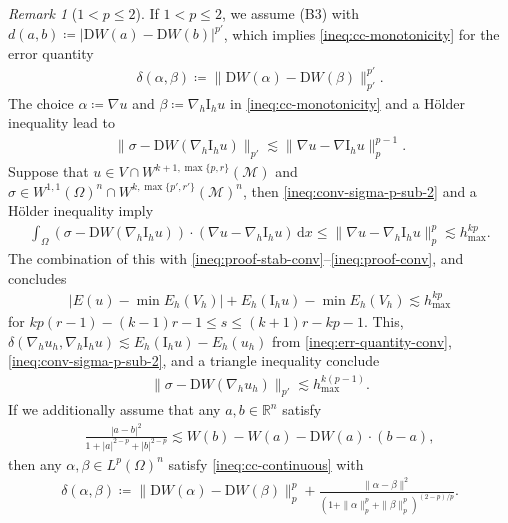 \documentclass[a4paper]{amsart}
\numberwithin{equation}{section}
\renewcommand{\d}[1]{\,\mathrm{d}#1}
\newcommand{\I}{\mathrm{I}}
\newcommand{\Mcal}{\mathcal{M}}
\newcommand{\D}{\mathrm{D}}
\theoremstyle{remark}
\newtheorem{remark}[theorem]{Remark}
\begin{document}
\begin{remark}[$1 < p \leq 2$]\label{remark:p_smaller_2}
    If $1 < p \leq 2$,
    we assume (B3) with $d(a,b) \coloneqq |\D W(a) - \D W(b)|^{p'}$, which implies \eqref{ineq:cc-monotonicity} for the error quantity
    \begin{align*}
    	\delta(\alpha,\beta) \coloneqq \|\D W(\alpha) - \D W(\beta)\|_{p'}^{p'}.
    \end{align*}
	The choice $\alpha \coloneqq \nabla u$ and $\beta \coloneqq \nabla_h \mathrm{I}_h u$ in \eqref{ineq:cc-monotonicity} and a H\"older inequality lead to
	\begin{align}\label{ineq:conv-sigma-p-sub-2}
		\|\sigma - \D W(\nabla_h \mathrm{I}_h u)\|_{p'} \lesssim \|\nabla u - \nabla \mathrm{I}_h u\|_{p}^{p-1}.
	\end{align}
	Suppose that $u \in V \cap W^{k+1,\max\{p,r\}}(\Mcal)$ and $\sigma \in W^{1,1}(\Omega)^n \cap W^{k,\max\{p',r'\}}(\Mcal)^n$, then \eqref{ineq:conv-sigma-p-sub-2} and a H\"older inequality imply
	\begin{align*}
		\int_\Omega (\sigma - \D W(\nabla_h \I_h u)) \cdot (\nabla u - \nabla_h \I_h u) \d{x} \leq \|\nabla u - \nabla_h \I_h u\|_p^p \lesssim h_{\max}^{kp}.
	\end{align*}
	The combination of this with \eqref{ineq:proof-stab-conv}--\eqref{ineq:proof-conv}, and  concludes
	\begin{align}\label{ineq:conv-rate-p-sub-2}
		|E(u) - \min E_h(V_h)| + E_h(\mathrm{I}_h u) - \min E_h(V_h) \lesssim h_{\max}^{kp}
	\end{align}
	for $kp(r-1) - (k-1)r - 1 \leq s \leq (k+1)r - kp - 1$.
	This, $\delta(\nabla_h u_h, \nabla_h \I_h u) \lesssim E_h(\I_h u) - E_h(u_h)$ from \eqref{ineq:err-quantity-conv}, \eqref{ineq:conv-sigma-p-sub-2}, and a triangle inequality conclude
	\begin{align*}
		\|\sigma - \D W(\nabla_h u_h)\|_{p'} \lesssim h_{\max}^{k(p-1)}.
	\end{align*}
	If we additionally assume that any $a,b \in \mathbb{R}^n$ satisfy
	\begin{align*}
		\frac{|a-b|^2}{1 + |a|^{2-p} + |b|^{2-p}} \lesssim W(b) - W(a) - \D W(a) \cdot (b-a),
	\end{align*}
	then any $\alpha, \beta \in L^p(\Omega)^n$ satisfy \eqref{ineq:cc-continuous} with
	\begin{align*}
		\delta(\alpha,\beta) \coloneqq \|\D W(\alpha) - \D W(\beta)\|_p^p + \frac{\|\alpha - \beta\|^2}{(1 + \|\alpha\|_p^p + \|\beta\|_p^p)^{(2-p)/p}}.

\end{align*}
\end{remark}
\end{document}
